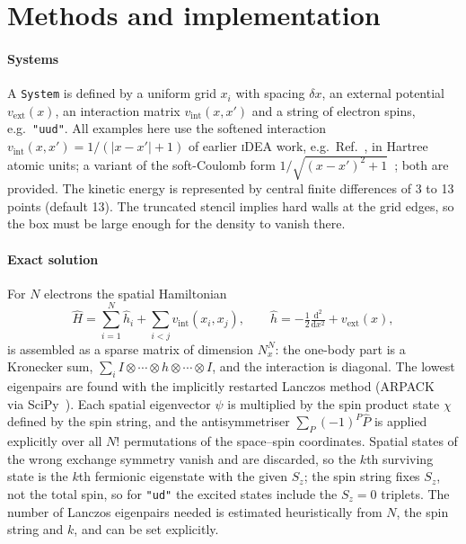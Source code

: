 \documentclass[5p,times,twocolumn]{elsarticle}
\newcommand{\iDEA}{\textsc{iDEA}}
\newcommand{\vext}{v_\mathrm{ext}}
\begin{document}
\section{Methods and implementation}

\paragraph{Systems}
A \texttt{System} is defined by a uniform grid $x_i$ with spacing $\delta x$, an external potential $\vext(x)$, an interaction matrix $v_\mathrm{int}(x,x')$ and a string of electron spins, e.g.\ \texttt{"uud"}. All examples here use the softened interaction $v_\mathrm{int}(x,x')=1/(|x-x'|+1)$ of earlier \iDEA{} work, e.g.\ Ref.~\cite{Hodgson2013}, in Hartree atomic units; a variant of the soft-Coulomb form $1/\sqrt{(x-x')^2+1}$~\cite{Javanainen1988}; both are provided. The kinetic energy is represented by central finite differences of 3 to 13 points (default 13). The truncated stencil implies hard walls at the grid edges, so the box must be large enough for the density to vanish there.

\paragraph{Exact solution}
For $N$ electrons the spatial Hamiltonian
\begin{equation}
\hat H=\sum_{i=1}^{N}\hat h_i+\sum_{i<j}v_\mathrm{int}(x_i,x_j),\qquad \hat h=-\tfrac12\tfrac{\mathrm{d}^2}{\mathrm{d}x^2}+\vext(x),
\end{equation}
is assembled as a sparse matrix of dimension $N_x^N$: the one-body part is a Kronecker sum, $\sum_i I\otimes\cdots\otimes h\otimes\cdots\otimes I$, and the interaction is diagonal. The lowest eigenpairs are found with the implicitly restarted Lanczos method (ARPACK~\cite{ARPACK} via SciPy~\cite{SciPy}). Each spatial eigenvector $\psi$ is multiplied by the spin product state $\chi$ defined by the spin string, and the antisymmetriser $\sum_P(-1)^P\hat P$ is applied explicitly over all $N!$ permutations of the space--spin coordinates. Spatial states of the wrong exchange symmetry vanish and are discarded, so the $k$th surviving state is the $k$th fermionic eigenstate with the given $S_z$; the spin string fixes $S_z$, not the total spin, so for \texttt{"ud"} the excited states include the $S_z=0$ triplets. The number of Lanczos eigenpairs needed is estimated heuristically from $N$, the spin string and $k$, and can be set explicitly.
\end{document}
